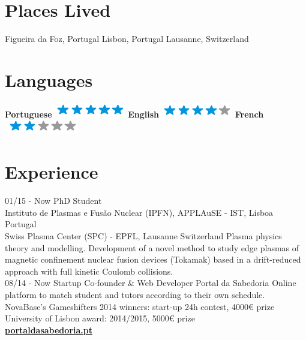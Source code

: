 \documentclass[]{friggeri-cv}
\begin{document}
\begin{aside}
  \section{Places Lived}
    Figueira da Foz, Portugal
    Lisbon, Portugal
    Lausanne, Switzerland
    ~
  \section{Languages}
    \textbf{Portuguese}\includegraphics[scale=0.40]{img/5stars.png}
    \textbf{English}\includegraphics[scale=0.40]{img/4stars.png}
    \textbf{French}\includegraphics[scale=0.40]{img/2stars.png}
\end{aside}

\section{Experience}
\begin{entrylist}
  \entry
    {01/15 - Now}
    {PhD Student}
    {\\
    Instituto de Plasmas e Fusão Nuclear (IPFN), APPLAuSE - IST, Lisboa Portugal
    \\
    Swiss Plasma Center (SPC) - EPFL, Lausanne Switzerland}
    {Plasma physics theory and modelling. Development of a novel method to study edge plasmas of magnetic confinement nuclear fusion devices (Tokamak) based in a drift-reduced approach with full kinetic Coulomb collisions.\\}
  \entry
    {08/14 - Now}
    {Startup Co-founder \& Web Developer}
    {Portal da Sabedoria}
    {Online platform to match student and tutors according to their own schedule.
    \\
    NovaBase's Gameshifters 2014 winners: start-up 24h contest, 4000€ prize
    \\
    University of Lisbon award: 2014/2015, 5000€ prize
    \\
    \href{http://portaldasabedoria.pt}{\textbf{portaldasabedoria.pt}}\\}
\end{entrylist}
\end{document}
